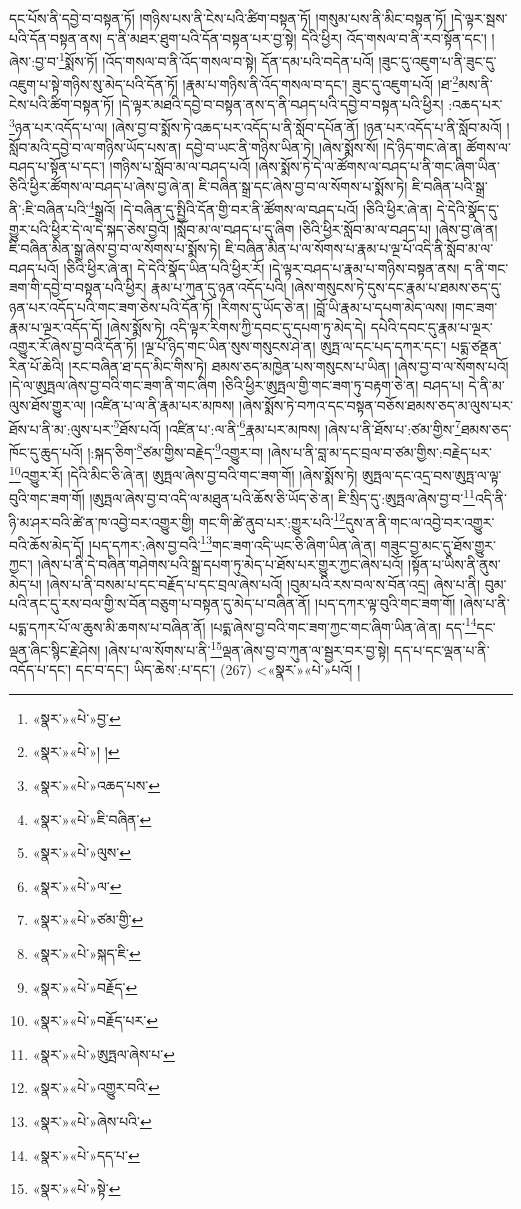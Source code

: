 དང་པོས་ནི་དབྱེ་བ་བསྟན་ཏོ། །གཉིས་པས་ནི་ངེས་པའི་ཚིག་བསྟན་ཏོ། །གསུམ་པས་ནི་མིང་བསྟན་ཏོ། །དེ་ལྟར་སྦས་པའི་དོན་བསྟན་ནས། ད་ནི་མཐར་ཐུག་པའི་དོན་བསྟན་པར་བྱ་སྟེ། དེའི་ཕྱིར། འོད་གསལ་བ་ནི་རབ་སྟོན་དང་། །ཞེས་:བྱ་བ་\footnote{«སྣར་»«པེ་»བྱ་}སྨོས་ཏོ། །འོད་གསལ་བ་ནི་འོད་གསལ་བ་སྟེ། དོན་དམ་པའི་བདེན་པའོ། །ཟུང་དུ་འཇུག་པ་ནི་ཟུང་དུ་འཇུག་པ་སྟེ་གཉིས་སུ་མེད་པའི་དོན་ཏོ། །རྣམ་པ་གཉིས་ནི་འོད་གསལ་བ་དང་། ཟུང་དུ་འཇུག་པའོ། །ཐ་\footnote{«སྣར་»«པེ་»། །}མས་ནི་ངེས་པའི་ཚིག་བསྟན་ཏོ། །དེ་ལྟར་མཐའི་དབྱེ་བ་བསྟན་ནས་ད་ནི་བཤད་པའི་དབྱེ་བ་བསྟན་པའི་ཕྱིར། :འཆད་པར་\footnote{«སྣར་»«པེ་»འཆད་པས་}ཉན་པར་འདོད་པ་ལ། །ཞེས་བྱ་བ་སྨོས་ཏེ་འཆད་པར་འདོད་པ་ནི་སློབ་དཔོན་ནོ། །ཉན་པར་འདོད་པ་ནི་སློབ་མའོ། །སློབ་མའི་དབྱེ་བ་ལ་གཉིས་ཡོད་པས་ན། དབྱེ་བ་ཡང་ནི་གཉིས་ཡིན་ཏེ། །ཞེས་སྨོས་སོ། །དེ་ཉིད་གང་ཞེ་ན། ཚོགས་ལ་བཤད་པ་སྟོན་པ་དང་། །གཉིས་པ་སློབ་མ་ལ་བཤད་པའོ། །ཞེས་སྨོས་ཏེ་དེ་ལ་ཚོགས་ལ་བཤད་པ་ནི་གང་ཞིག་ཡིན་ཅིའི་ཕྱིར་ཚོགས་ལ་བཤད་པ་ཞེས་བྱ་ཞེ་ན། ཇི་བཞིན་སྒྲ་དང་ཞེས་བྱ་བ་ལ་སོགས་པ་སྨོས་ཏེ། ཇི་བཞིན་པའི་སྒྲ་ནི་:ཇི་བཞིན་པའི་\footnote{«སྣར་»«པེ་»ཇི་བཞིན་}སྒྲའོ། །དེ་བཞིན་དུ་སྤྱིའི་དོན་གྱི་བར་ནི་ཚོགས་ལ་བཤད་པའོ། །ཅིའི་ཕྱིར་ཞེ་ན། དེ་དེའི་སྣོད་དུ་གྱུར་པའི་ཕྱིར་དེ་ལ་དེ་སྐད་ཅེས་བྱའོ། །སློབ་མ་ལ་བཤད་པ་དུ་ཞིག །ཅིའི་ཕྱིར་སློབ་མ་ལ་བཤད་པ། །ཞེས་བྱ་ཞེ་ན། ཇི་བཞིན་མིན་སྒྲ་ཞེས་བྱ་བ་ལ་སོགས་པ་སྨོས་ཏེ། ཇི་བཞིན་མིན་པ་ལ་སོགས་པ་རྣམ་པ་ལྔ་པོ་འདི་ནི་སློབ་མ་ལ་བཤད་པའོ། །ཅིའི་ཕྱིར་ཞེ་ན། དེ་དེའི་སྣོད་ཡིན་པའི་ཕྱིར་རོ། །དེ་ལྟར་བཤད་པ་རྣམ་པ་གཉིས་བསྟན་ནས། ད་ནི་གང་ཟག་གི་དབྱེ་བ་བསྟན་པའི་ཕྱིར། རྣམ་པ་ཀུན་དུ་ཉན་འདོད་པའི། །ཞེས་གསུངས་ཏེ་དུས་དང་རྣམ་པ་ཐམས་ཅད་དུ་ཉན་པར་འདོད་པའི་གང་ཟག་ཅེས་པའི་དོན་ཏོ། །རིགས་དུ་ཡོད་ཅེ་ན། །བློ་ཡི་རྣམ་པ་དཔག་མེད་ལས། །གང་ཟག་རྣམ་པ་ལྔར་འདོད་དོ། །ཞེས་སྨོས་ཏེ། འདི་ལྟར་རིགས་ཀྱི་དབང་དུ་དཔག་ཏུ་མེད་དེ། དཔེའི་དབང་དུ་རྣམ་པ་ལྔར་འགྱུར་རོ་ཞེས་བྱ་བའི་དོན་ཏོ། །ལྔ་པོ་ཉིད་གང་ཡིན་སུས་གསུངས་ཤེ་ན། ཨུཏྤ་ལ་དང་པད་དཀར་དང་། པདྨ་ཙནྡན་རིན་པོ་ཆེའི། །རང་བཞིན་ཐ་དད་མིང་གིས་ཏེ། ཐམས་ཅད་མཁྱེན་པས་གསུངས་པ་ཡིན། །ཞེས་བྱ་བ་ལ་སོགས་པའོ། །དེ་ལ་ཨུཏྤལ་ཞེས་བྱ་བའི་གང་ཟག་ནི་གང་ཞིག །ཅིའི་ཕྱིར་ཨུཏྤལ་གྱི་གང་ཟག་ཏུ་བརྟག་ཅེ་ན། བཤད་པ། དེ་ནི་མ་ལུས་ཐོས་གྱུར་ལ། །འཛིན་པ་ལ་ནི་རྣམ་པར་མཁས། །ཞེས་སྨོས་ཏེ་བཀའ་དང་བསྟན་བཅོས་ཐམས་ཅད་མ་ལུས་པར་ཐོས་པ་ནི་མ་:ལུས་པར་\footnote{«སྣར་»«པེ་»ལུས་}ཐོས་པའོ། །འཛིན་པ་:ལ་ནི་\footnote{«སྣར་»«པེ་»ལ་}རྣམ་པར་མཁས། །ཞེས་པ་ནི་ཐོས་པ་:ཙམ་གྱིས་\footnote{«སྣར་»«པེ་»ཙམ་གྱི་}ཐམས་ཅད་ཁོང་དུ་ཆུད་པའོ། །:སྐད་ཅིག་\footnote{«སྣར་»«པེ་»སྐད་ཇི་}ཙམ་གྱིས་བརྗེད་\footnote{«སྣར་»«པེ་»བརྗོད་}འགྱུར་བ། །ཞེས་པ་ནི་བླ་མ་དང་བྲལ་བ་ཙམ་གྱིས་:བརྗེད་པར་\footnote{«སྣར་»«པེ་»བརྗོད་པར་}འགྱུར་རོ། །དེའི་མིང་ཅི་ཞེ་ན། ཨུཏྤལ་ཞེས་བྱ་བའི་གང་ཟག་གོ། །ཞེས་སྨོས་ཏེ། ཨུཏྤལ་དང་འདྲ་བས་ཨུཏྤ་ལ་ལྟ་བུའི་གང་ཟག་གོ། །ཨུཏྤལ་ཞེས་བྱ་བ་འདི་ལ་མཐུན་པའི་ཆོས་ཅི་ཡོད་ཅེ་ན། ཇི་སྲིད་དུ་:ཨུཏྤལ་ཞེས་བྱ་བ་\footnote{«སྣར་»«པེ་»ཨུཏྤལ་ཞེས་པ་}འདི་ནི་ཉི་མ་ཤར་བའི་ཚེ་ན་ཁ་འབྱེ་བར་འགྱུར་གྱི། གང་གི་ཚེ་ནུབ་པར་:གྱུར་པའི་\footnote{«སྣར་»«པེ་»འགྱུར་བའི་}དུས་ན་ནི་གང་ལ་འབྱེ་བར་འགྱུར་བའི་ཆོས་མེད་དོ། །པད་དཀར་:ཞེས་བྱ་བའི་\footnote{«སྣར་»«པེ་»ཞེས་པའི་}གང་ཟག་འདི་ཡང་ཅི་ཞིག་ཡིན་ཞེ་ན། གཟུང་བྱ་མང་དུ་ཐོས་གྱུར་ཀྱང་། །ཞེས་པ་ནི་དེ་བཞིན་གཤེགས་པའི་སྒྲ་དཔག་ཏུ་མེད་པ་ཐོས་པར་གྱུར་ཀྱང་ཞེས་པའོ། །སྟོན་པ་ཡིས་ནི་ནུས་མེད་པ། །ཞེས་པ་ནི་བསམ་པ་དང་བརྗོད་པ་དང་བྲལ་ཞེས་པའོ། །བུམ་པའི་རས་བལ་ས་བོན་འདྲ། ཞེས་པ་ནི། བུམ་པའི་ནང་དུ་རས་བལ་གྱི་ས་བོན་བཅུག་པ་བསྟན་དུ་མེད་པ་བཞིན་ནོ། །པད་དཀར་ལྟ་བུའི་གང་ཟག་གོ། །ཞེས་པ་ནི་པདྨ་དཀར་པོ་ལ་ཆུས་མི་ཆགས་པ་བཞིན་ནོ། །པདྨ་ཞེས་བྱ་བའི་གང་ཟག་ཀྱང་གང་ཞིག་ཡིན་ཞེ་ན། དད་\footnote{«སྣར་»«པེ་»དད་པ་}དང་ལྡན་ཞིང་སྙིང་རྗེ་ཤེས། །ཞེས་པ་ལ་སོགས་པ་ནི་\footnote{«སྣར་»«པེ་»སྟེ་}ལྡན་ཞེས་བྱ་བ་ཀུན་ལ་སྦྱར་བར་བྱ་སྟེ། དད་པ་དང་ལྡན་པ་ནི་འདོད་པ་དང་། དང་བ་དང་། ཡིད་ཆེས་:པ་དང་། (267) <«སྣར་»«པེ་»པའོ། །
